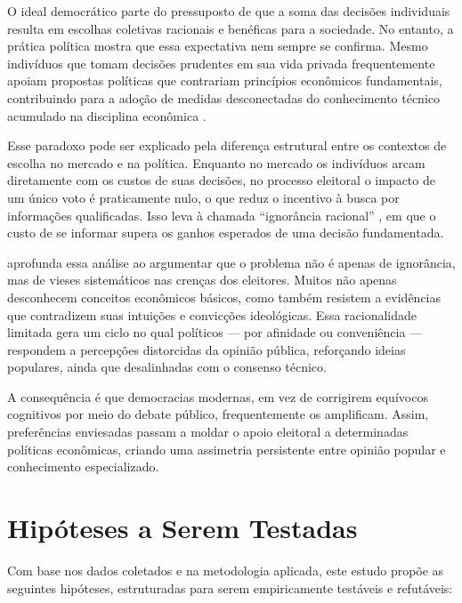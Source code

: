 O ideal democrático parte do pressuposto de que a soma das decisões individuais resulta em escolhas coletivas racionais e benéficas para a sociedade. No entanto, a prática política mostra que essa expectativa nem sempre se confirma. Mesmo indivíduos que tomam decisões prudentes em sua vida privada frequentemente apoiam propostas políticas que contrariam princípios econômicos fundamentais, contribuindo para a adoção de medidas desconectadas do conhecimento técnico acumulado na disciplina econômica \cite{downs1957economic,The_Myth_of_the_Rational_Voter}.

Esse paradoxo pode ser explicado pela diferença estrutural entre os contextos de escolha no mercado e na política. Enquanto no mercado os indivíduos arcam diretamente com os custos de suas decisões, no processo eleitoral o impacto de um único voto é praticamente nulo, o que reduz o incentivo à busca por informações qualificadas. Isso leva à chamada “ignorância racional” \cite{downs1957economic}, em que o custo de se informar supera os ganhos esperados de uma decisão fundamentada.

 aprofunda essa análise ao argumentar que o problema não é apenas de ignorância, mas de vieses sistemáticos nas crenças dos eleitores. Muitos não apenas desconhecem conceitos econômicos básicos, como também resistem a evidências que contradizem suas intuições e convicções ideológicas. Essa racionalidade limitada gera um ciclo no qual políticos — por afinidade ou conveniência — respondem a percepções distorcidas da opinião pública, reforçando ideias populares, ainda que desalinhadas com o consenso técnico.

A consequência é que democracias modernas, em vez de corrigirem equívocos cognitivos por meio do debate público, frequentemente os amplificam. Assim, preferências enviesadas passam a moldar o apoio eleitoral a determinadas políticas econômicas, criando uma assimetria persistente entre opinião popular e conhecimento especializado.

\section{Hipóteses a Serem Testadas}

Com base nos dados coletados e na metodologia aplicada, este estudo propõe as seguintes hipóteses, estruturadas para serem empiricamente testáveis e refutáveis:

